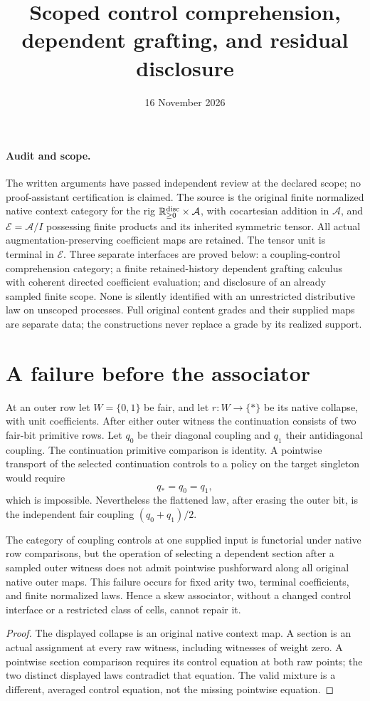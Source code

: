 \documentclass[11pt]{article}
\title{Scoped control comprehension, dependent grafting, and residual disclosure}
\date{16 November 2026}
\begin{document}
\maketitle
\paragraph{Audit and scope.} The written arguments have passed independent review at the declared scope; no proof-assistant certification is claimed. The source is the original finite normalized native context category for the rig $\mathbb R_{\geq0}^{\rm disc}\times\mathcal A$, with cocartesian addition in $\mathcal A$, and $\mathcal E=\mathcal A/I$ possessing finite products and its inherited symmetric tensor. All actual augmentation-preserving coefficient maps are retained. The tensor unit is terminal in $\mathcal E$. Three separate interfaces are proved below: a coupling-control comprehension category; a finite retained-history dependent grafting calculus with coherent directed coefficient evaluation; and disclosure of an already sampled finite scope. None is silently identified with an unrestricted distributive law on unscoped processes. Full original content grades and their supplied maps are separate data; the constructions never replace a grade by its realized support.

\section{A failure before the associator}
At an outer row let $W=\{0,1\}$ be fair, and let $r:W\to\{*\}$ be its native collapse, with unit coefficients. After either outer witness the continuation consists of two fair-bit primitive rows. Let $q_0$ be their diagonal coupling and $q_1$ their antidiagonal coupling. The continuation primitive comparison is identity. A pointwise transport of the selected continuation controls to a policy on the target singleton would require
\[
 q_*=q_0=q_1,
\]
which is impossible. Nevertheless the flattened law, after erasing the outer bit, is the independent fair coupling $(q_0+q_1)/2$.

\begin{proposition}
The category of coupling controls at one supplied input is functorial under native row comparisons, but the operation of selecting a dependent section after a sampled outer witness does not admit pointwise pushforward along all original native outer maps. This failure occurs for fixed arity two, terminal coefficients, and finite normalized laws. Hence a skew associator, without a changed control interface or a restricted class of cells, cannot repair it.
\end{proposition}
\begin{proof}
The displayed collapse is an original native context map. A section is an actual assignment at every raw witness, including witnesses of weight zero. A pointwise section comparison requires its control equation at both raw points; the two distinct displayed laws contradict that equation. The valid mixture is a different, averaged control equation, not the missing pointwise equation.\end{proof}
\end{document}
